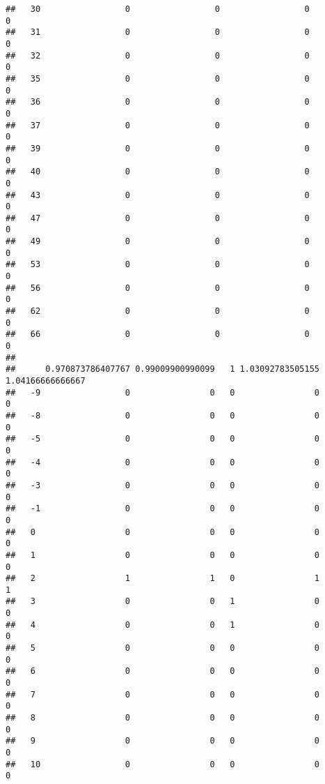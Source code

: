 \documentclass[]{article}
\begin{document}
\begin{verbatim}
##   30                 0                 0                 0                 0
##   31                 0                 0                 0                 0
##   32                 0                 0                 0                 0
##   35                 0                 0                 0                 0
##   36                 0                 0                 0                 0
##   37                 0                 0                 0                 0
##   39                 0                 0                 0                 0
##   40                 0                 0                 0                 0
##   43                 0                 0                 0                 0
##   47                 0                 0                 0                 0
##   49                 0                 0                 0                 0
##   53                 0                 0                 0                 0
##   56                 0                 0                 0                 0
##   62                 0                 0                 0                 0
##   66                 0                 0                 0                 0
##     
##      0.970873786407767 0.99009900990099   1 1.03092783505155 1.04166666666667
##   -9                 0                0   0                0                0
##   -8                 0                0   0                0                0
##   -5                 0                0   0                0                0
##   -4                 0                0   0                0                0
##   -3                 0                0   0                0                0
##   -1                 0                0   0                0                0
##   0                  0                0   0                0                0
##   1                  0                0   0                0                0
##   2                  1                1   0                1                1
##   3                  0                0   1                0                0
##   4                  0                0   1                0                0
##   5                  0                0   0                0                0
##   6                  0                0   0                0                0
##   7                  0                0   0                0                0
##   8                  0                0   0                0                0
##   9                  0                0   0                0                0
##   10                 0                0   0                0                0

\end{verbatim}
\end{document}
